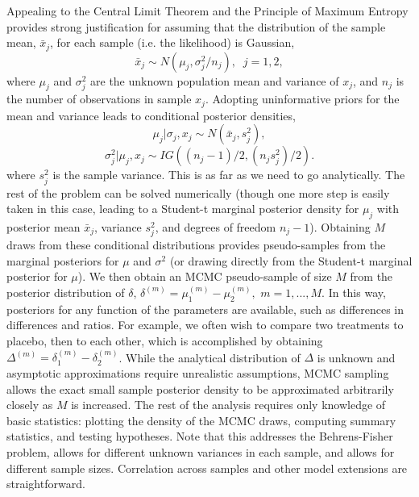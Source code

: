 \documentclass{juliacon}
\begin{document}
Appealing to the Central Limit Theorem and the Principle of Maximum Entropy provides strong justification for assuming that the distribution of the sample mean, $\bar{x}_j$, for each sample (i.e. the likelihood) is Gaussian, 
\begin{equation}
\bar{x}_j \sim N(\mu_j,\sigma_j^2/n_j ), \; \;    j=1,2,
\label{eq:xbar}
\end{equation}
where $\mu_j$ and $\sigma_j^2$ are the unknown population mean and variance of $x_j$, and $n_j$ is the number of observations in sample $x_j$. Adopting uninformative priors for the mean and variance leads to conditional posterior densities,
\begin{equation}
\mu_j | \sigma_j,x_j \sim N(\bar{x}_j, s_j^2),
\label{eq:muj}
\end{equation}
\begin{equation}
\sigma_j^2|\mu_j,x_j \sim IG((n_j-1)/2,(n_js_j^2)/2).
\label{eq:sigmaj}
\end{equation}
where $s_j^2$ is the sample variance. This is as far as we need to go analytically.  The rest of the problem can be solved numerically (though one more step is easily taken in this case, leading to a Student-t marginal posterior density for $\mu_j$ with posterior mean $\bar{x}_j$, variance $s_j^2$, and degrees of freedom $n_j-1$).
\vskip 6pt
Obtaining $M$ draws from these conditional distributions provides pseudo-samples from the marginal posteriors for $\mu$ and $\sigma^2$ (or drawing directly from the Student-t marginal posterior for $\mu$).  We then obtain an MCMC pseudo-sample of size $M$ from the posterior distribution of $\delta$, $\delta^{(m)} = \mu_1^{(m)} - \mu_2^{(m)},$ $m = 1,...,M$.  In this way, posteriors for any function of the parameters are available, such as differences in differences and ratios. For example, we often wish to compare two treatments to placebo, then to each other, which is accomplished by obtaining $\Delta^{(m)} = \delta_1^{(m)} - \delta_2^{(m)}$. While the analytical distribution of $\Delta$ is unknown and asymptotic approximations require unrealistic assumptions,  MCMC sampling allows the exact small sample posterior density to be approximated arbitrarily closely as $M$ is increased. The rest of the analysis requires only knowledge of basic statistics: plotting the density of the MCMC draws, computing summary statistics, and testing hypotheses.   Note that this addresses the Behrens-Fisher problem, allows for different unknown variances in each sample, and allows for different sample sizes.  Correlation across samples and other model extensions are straightforward.
\end{document}
